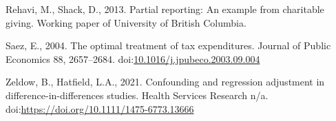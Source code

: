 \documentclass[
  11pt,
  a4paper,
]{article}
\newlength{\cslhangindent}
\newlength{\cslentryspacingunit} %
\newenvironment{CSLReferences}[2] %
 {%
  \setlength{\parindent}{0pt}
  \ifodd #1
  \let\oldpar\par
  \def\par{\hangindent=\cslhangindent\oldpar}
  \fi
  \setlength{\parskip}{#2\cslentryspacingunit}
 }%
 {}
\newlength{\cslhangindent}
\newenvironment{CSLReferences}[2] %
 {%
  \setlength{\parindent}{0pt}
  \ifodd #1 \everypar{\setlength{\hangindent}{\cslhangindent}}\ignorespaces\fi
  \ifnum #2 > 0
  \setlength{\parskip}{#2\baselineskip}
  \fi
 }%
 {}
\begin{document}
\begin{CSLReferences}{1}{0}
\leavevmode{}%
Rehavi, M., Shack, D., 2013. Partial reporting: An example from charitable giving. Working paper of University of British Columbia.

\leavevmode{}%
Saez, E., 2004. The optimal treatment of tax expenditures. Journal of Public Economics 88, 2657--2684. doi:\href{https://doi.org/10.1016/j.jpubeco.2003.09.004}{10.1016/j.jpubeco.2003.09.004}

\leavevmode{}%
Zeldow, B., Hatfield, L.A., 2021. Confounding and regression adjustment in difference-in-differences studies. Health Services Research n/a. doi:\url{https://doi.org/10.1111/1475-6773.13666}

\end{CSLReferences}
\end{document}
